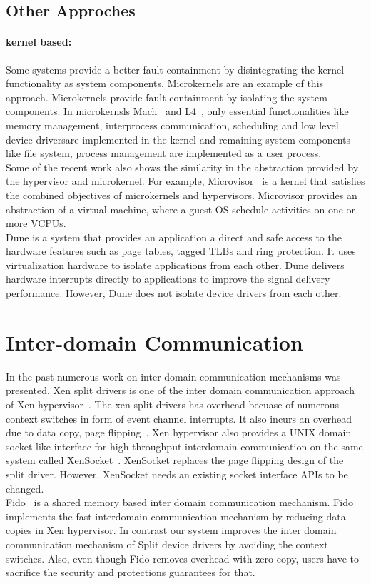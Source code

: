 \subsection*{Other Approches}
\paragraph{kernel based:}
Some systems provide a better fault containment by disintegrating the kernel functionality as system components. Microkernels are an example of this approach. Microkernels provide fault containment by isolating the system components. In microkernsls Mach~\cite{Accetta+:usenix86} and L4~\cite{Liedtke+:sosp95}, only essential functionalities like memory management, interprocess communication, scheduling and low level device driversare implemented in the kernel and remaining system components like file system, process management are implemented as a user process.
\\[3mm]
Some of the recent work also shows the similarity in the abstraction provided by the hypervisor and microkernel. For example, Microvisor~\cite{Heiser+:acm10} is a kernel that satisﬁes the combined objectives of microkernels and hypervisors. Microvisor provides an abstraction of a virtual machine, where a guest OS schedule activities on one or more VCPUs.
\\[3mm]
Dune is a system that provides an application a direct and safe access to the hardware features such as page tables, tagged TLBs and ring protection. It uses virtualization hardware to isolate applications from each other. Dune delivers hardware interrupts directly to applications to improve the signal delivery performance. However, Dune does not isolate device drivers from each other.

\section{Inter-domain Communication}
In the past numerous work on inter domain communication mechanisms was presented. Xen split drivers is one of the inter domain communication approach of Xen hypervisor~\cite{Fraser04safehardware}. The xen split drivers has overhead becuase of numerous context switches in form of event channel interrupts. It also incurs an overhead due to data copy, page flipping~\cite{Zhang:2007:XHI:1516124.1516138}. Xen hypervisor also provides a UNIX domain socket like interface for high throughput interdomain communication on the same system called XenSocket~\cite{Zhang:2007:XHI:1516124.1516138}. XenSocket replaces the page flipping design of the split driver. However, XenSocket needs an existing socket interface APIs to be changed. 
\\[3mm]
Fido~\cite{Burtsev:2009:FFI:1855807.1855832} is a shared memory based inter domain communication mechanism. Fido implements the fast interdomain communication mechanism by reducing data copies in Xen hypervisor. In contrast our system improves the inter domain communication mechanism of Split device drivers by avoiding the context switches. Also, even though Fido removes overhead with zero copy, users have to sacrifice the security and protections guarantees for that.
\\[3mm]

